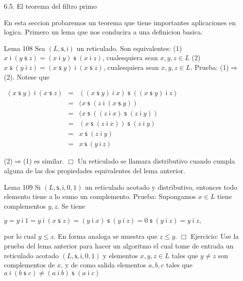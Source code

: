 6.5. El teorema del filtro primo

En esta seccion probaremos un teorema que tiene importantes aplicaciones en logica. Primero un lema que nos conducira a una definicion basica.

Lema 108 Sea \((L,\mathsf{s},\mathsf{i})\) un reticulado. Son equivalentes:
(1) \(x\mathsf{\;i\;}(y\;\mathsf{s}\;z)=(x\mathsf{\;i\;}y)\;\mathsf{s} \;(x\mathsf{\;i\;}z)\), cualesquiera sean \(x,y,z\in L\)
(2) \(x\;\mathsf{s}\;(y\mathsf{\;i\;}z)=(x\mathsf{\;s\;}y)\mathsf{\;i\; }(x\;\mathsf{s}\;z)\), cualesquiera sean \(x,y,z\in L\).
Prueba: (1)\(\Rightarrow \)(2). Notese que

\(\displaystyle \begin{array}{rcl} (x\mathsf{\;s\;}y)\mathsf{\;i\;}(x\;\mathsf{s}\;z) & =& ((x\mathsf{\;s\;}y) \mathsf{\;i\;}x)\;\mathsf{s}\;((x\mathsf{\;s\;}y)\mathsf{\;i\;}z) \\ & =& (x\;\mathsf{s}\;(z\mathsf{\;i\;}(x\mathsf{\;s\;}y)) \\ & =& (x\;\mathsf{s}\;((z\;\mathsf{i\;}x)\mathsf{\;s\;}(z\;\mathsf{i\;}y)) \\ & =& (x\;\mathsf{s}\;(z\;\mathsf{i\;}x))\mathsf{\;s\;}(z\;\mathsf{i\;}y) \\ & =& x\mathsf{\;s\;}(z\;\mathsf{i\;}y) \\ & =& x\mathsf{\ s\ }(y\ \mathsf{i\ }z) \end{array} \)

(2)\(\Rightarrow \)(1) es similar. \(\Box\)
Un reticulado se llamara distributivo cuando cumpla alguna de las dos propiedades equivalentes del lema anterior.

Lema 109 Si \((L,\mathsf{s},\mathsf{i},0,1)\) un reticulado acotado y distributivo, entonces todo elemento tiene a lo sumo un complemento.
Prueba: Supongamos \(x\in L\) tiene complementos \(y,z\). Se tiene

\(\displaystyle y=y\;\mathsf{i\;}1=y\;\mathsf{i\;}(x\;\mathsf{s\;}z)=(y\;\mathsf{i\;}x)\; \mathsf{s\;}(y\;\mathsf{i\;}z)=0\;\mathsf{s\;}(y\;\mathsf{i\;}z)=y\;\mathsf{ i\;}z, \)

por lo cual \(y\leq z\). En forma analoga se muestra que \(z\leq y\). \(\Box\)
Ejercicio: Use la prueba del lema anterior para hacer un algoritmo el cual tome de entrada un reticulado acotado \((L,\mathsf{s},\mathsf{i},0,1)\) y elementos \(x,y,z\in L\) tales que \(y\neq z\) son complementos de \(x\), y de como salida elementos \(a,b,c\) tales que \(a\mathsf{\;i\;}(b\;\mathsf{s} \;c)\neq (a\mathsf{\;i\;}b)\;\mathsf{s}\;(a\mathsf{\;i\;}c)\)

